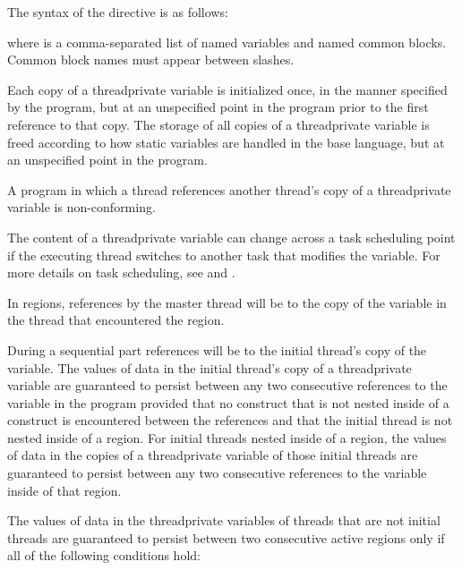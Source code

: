 \begin{fortranspecific}
The syntax of the  directive is as follows:


where  is a comma-separated list of named variables and named common blocks.
Common block names must appear between slashes.
\end{fortranspecific}

\descr
Each copy of a threadprivate variable is initialized once, in the manner specified 
by the program, but at an unspecified point in the program prior to the first 
reference to that copy. The storage of all copies of a threadprivate variable is 
freed according to how static variables are handled in the base language, but at 
an unspecified point in the program.

A program in which a thread references another thread's copy of a threadprivate 
variable is non-conforming.

The content of a threadprivate variable can change across a task scheduling point 
if the executing thread switches to another task that modifies the variable. For 
more details on task scheduling, see  and
.

In  regions, references by the master thread will be to the copy of the
variable in the thread that encountered the  region.

During a sequential part references will be to the initial thread's copy of the 
variable. The values of data in the initial thread's copy of a threadprivate 
variable are guaranteed to persist between any two consecutive references to 
the variable in the program provided that no  construct that is not 
nested inside of a  construct is encountered between the references 
and that the initial thread is not nested inside of a  region.
For initial threads nested inside of a  region, the values of data
in the copies of a threadprivate variable of those initial threads are guaranteed
to persist between any two consecutive references to the variable inside of that
 region.

The values of data in the threadprivate variables of threads that are not
initial threads are guaranteed to persist between two consecutive active
 regions only if all of the following conditions hold:

